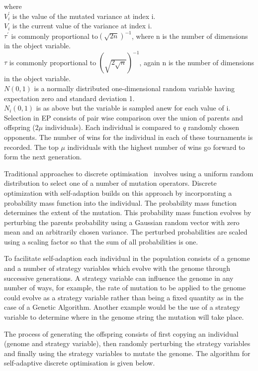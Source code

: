 where \\
$V^{'}_i$ is the value of the mutated variance at index i. \\
$V_i$ is the current value of the variance at index i. \\
$\tau^{'}$ is commonly proportional to$ (\sqrt{2n})^{-1}$, where n is the number of dimensions in the object variable.  \\
$\tau$ is commonly proportional to $(\sqrt{2\sqrt{n}})^{-1}$, again n is the number of dimensions in the object variable. \\
$N(0,1)$ is a normally distributed one-dimensional random variable having expectation zero and standard deviation 1. \\
$N_i(0,1)$ is as above but the variable is sampled anew for each value of i. \\

 
\label{ep_selection}Selection in EP consists of pair wise comparison over the union of parents and offspring ($2\mu$ individuals). Each individual is compared to \emph{q} randomly chosen opponents. The number of wins for the individual in each of these tournaments is recorded. The top $\mu$ individuals with the highest number of wins go forward to form the next generation.

Traditional approaches to discrete optimisation~\cite{fogel} involves using a uniform random distribution to select one of a number of mutation operators. Discrete optimization with self-adaption builds on this approach by incorporating a probability mass function into the individual. The probability mass function determines the extent of the mutation. This probability mass function  evolves by perturbing the parents probability using a Gaussian random vector with zero mean and an arbitrarily chosen variance. The perturbed probabilities are scaled using a scaling factor so that the sum of all probabilities is one. 

To facilitate self-adaption each individual in the population consists of a genome and a number of strategy variables which  evolve with the genome through successive generations. A strategy variable can influence the genome in any number of ways, for example, the rate of mutation to be applied to the genome could evolve as a strategy variable rather than being a fixed quantity as in the case of a Genetic Algorithm. Another example would  be the use of a strategy variable to determine where in the genome string the mutation will take place. 

The process of generating the offspring consists of first copying an individual (genome and strategy variable), then randomly perturbing the strategy variables and finally using the strategy variables to mutate the genome. The algorithm for self-adaptive discrete optimisation is given below.


